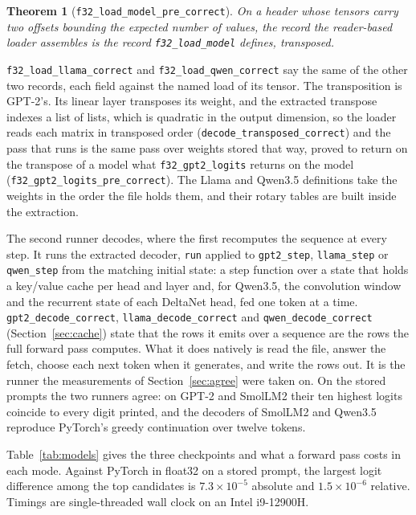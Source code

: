 \documentclass[11pt]{article}
\theoremstyle{plain}
\newtheorem{theorem}{Theorem}[section]
\theoremstyle{definition}
\newcommand{\code}[1]{\texttt{#1}}
\begin{document}
\begin{theorem}[\code{f32\_load\_model\_pre\_correct}]
On a header whose tensors carry two offsets bounding the expected number of
values, the record the reader-based loader assembles is the record
\code{f32\_load\_model} defines, transposed.
\end{theorem}

\code{f32\_load\_llama\_correct} and \code{f32\_load\_qwen\_correct} say the
same of the other two records, each field against the named load of its tensor.
The transposition is GPT-2's. Its linear layer transposes its weight, and the
extracted transpose indexes a list of lists, which is quadratic in the output
dimension, so the loader reads each matrix in transposed order
(\code{decode\_transposed\_correct}) and the pass that runs is the same pass
over weights stored that way, proved to return on the transpose of a model what
\code{f32\_gpt2\_logits} returns on the model
(\code{f32\_gpt2\_logits\_pre\_correct}). The Llama and Qwen3.5 definitions
take the weights in the order the file holds them, and their rotary tables are
built inside the extraction.

The second runner decodes, where the first recomputes the sequence at every
step. It runs the extracted decoder, \code{run} applied to \code{gpt2\_step},
\code{llama\_step} or \code{qwen\_step} from the matching initial state: a step
function over a state that holds a key/value cache per head and layer and, for
Qwen3.5, the convolution window and the recurrent state of each DeltaNet head,
fed one token at a time. \code{gpt2\_decode\_correct},
\code{llama\_decode\_correct} and \code{qwen\_decode\_correct}
(Section~\ref{sec:cache}) state that the rows it emits over a sequence are the
rows the full forward pass computes. What it does natively is read the file,
answer the fetch, choose each next token when it generates, and write the rows
out. It is the runner the measurements of Section~\ref{sec:agree} were taken
on. On the stored prompts the two runners agree: on GPT-2 and SmolLM2 their
ten highest logits coincide to every digit printed, and the decoders of
SmolLM2 and Qwen3.5 reproduce PyTorch's greedy continuation over twelve
tokens.

Table~\ref{tab:models} gives the three checkpoints and what a forward pass
costs in each mode. Against PyTorch in float32 on a stored prompt, the largest
logit difference among the top candidates is $7.3\times10^{-5}$ absolute and
$1.5\times10^{-6}$ relative. Timings are single-threaded
wall clock on an Intel i9-12900H.
\end{document}
